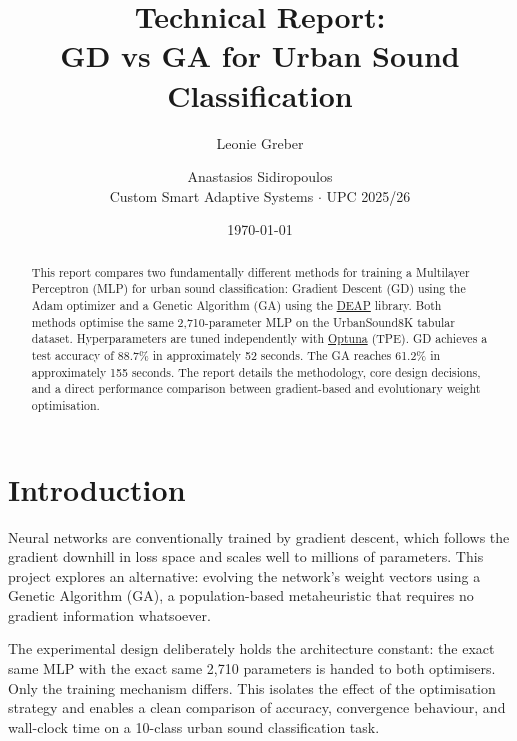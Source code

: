 \documentclass[11pt,a4paper]{article}
\title{Technical Report:\\GD vs GA for Urban Sound Classification}
\author{Leonie Greber \and Anastasios Sidiropoulos\\
\small Custom Smart Adaptive Systems $\cdot$ UPC 2025/26}
\date{\today}
\begin{document}
\maketitle

\begin{abstract}
This report compares two fundamentally different methods for training a Multilayer Perceptron (MLP)
for urban sound classification: Gradient Descent (GD) using the Adam optimizer and a Genetic
Algorithm (GA) using the \href{https://deap.readthedocs.io}{DEAP} library. Both methods optimise
the same 2,710-parameter MLP on the UrbanSound8K tabular dataset. Hyperparameters are tuned
independently with \href{https://optuna.org}{Optuna} (TPE). GD achieves a test accuracy of 88.7\%
in approximately 52 seconds. The GA reaches 61.2\% in approximately 155 seconds. The report
details the methodology, core design decisions, and a direct performance comparison between
gradient-based and evolutionary weight optimisation.
\end{abstract}

\tableofcontents
\newpage

\section{Introduction}

Neural networks are conventionally trained by gradient descent, which follows the gradient downhill
in loss space and scales well to millions of parameters. This project explores an alternative:
evolving the network's weight vectors using a Genetic Algorithm (GA), a population-based
metaheuristic that requires no gradient information whatsoever.

The experimental design deliberately holds the architecture constant: the exact same MLP with the
exact same 2,710 parameters is handed to both optimisers. Only the training mechanism differs. This
isolates the effect of the optimisation strategy and enables a clean comparison of accuracy,
convergence behaviour, and wall-clock time on a 10-class urban sound classification task.
\end{document}
